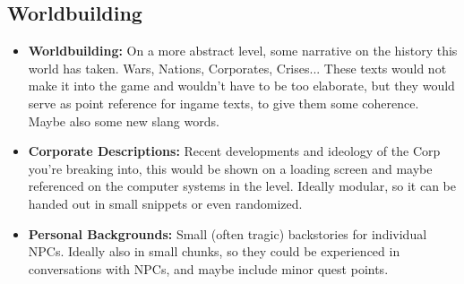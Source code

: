 \documentclass[11pt,a4paper, twocolumn]{article}
\begin{document}
\subsection{Worldbuilding}
    \begin{itemize}
        \item \textbf{Worldbuilding:} On a more abstract level, some narrative on the history this world has taken.
                    Wars, Nations, Corporates, Crises... These texts would not make it into the game and wouldn't have to
                    be too elaborate, but they would serve as point reference for ingame texts, to give them some coherence.
                    Maybe also some new slang words.
        \item \textbf{Corporate Descriptions:} Recent developments and ideology of the Corp you're breaking into, this would
                    be shown on a loading screen and maybe referenced on the computer systems in the level. Ideally modular,
                    so it can be handed out in small snippets or even randomized.
        \item \textbf{Personal Backgrounds:} Small (often tragic) backstories for individual NPCs. Ideally also in small
                    chunks, so they could be experienced in conversations with NPCs, and maybe include minor quest points.
    \end{itemize}
\end{document}
